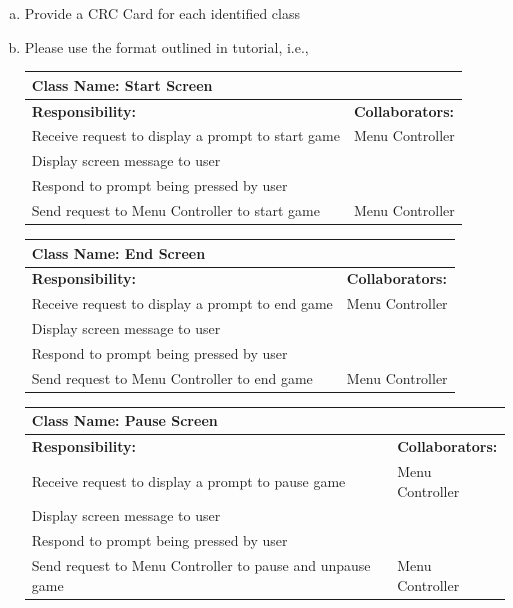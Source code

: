 \documentclass[12pt, titlepage]{article}
\begin{document}
\begin{enumerate}[a)]
	\item Provide a CRC Card for each identified class
	\item Please use the format outlined in tutorial, i.e., 

	\begin{table}[H]
		\centering
		\begin{tabular}{|p{10cm}|p{5cm}|}
		\hline 
		 \multicolumn{2}{|l|}{\textbf{Class Name: Start Screen}} \\
		\hline
		\textbf{Responsibility:} & \textbf{Collaborators:} \\
		\hline
		 Receive request to display a prompt to start game& Menu Controller \\
		\hline
		 Display screen message to user& \\
		\hline
		 Respond to prompt being pressed by user& \\
		\hline
		 Send request to Menu Controller to start game& Menu Controller \\
		\hline
		\end{tabular}
	\end{table}
	
	\begin{table}[H]
		\centering
		\begin{tabular}{|p{10cm}|p{5cm}|}
		\hline 
		 \multicolumn{2}{|l|}{\textbf{Class Name: End Screen}} \\
		\hline
		\textbf{Responsibility:} & \textbf{Collaborators:} \\
		\hline
		 Receive request to display a prompt to end game& Menu Controller \\
		\hline
		 Display screen message to user& \\
		\hline
		 Respond to prompt being pressed by user& \\
		\hline
		 Send request to Menu Controller to end game& Menu Controller \\
		\hline
		\end{tabular}
	\end{table}
	
	\begin{table}[H]
		\centering
		\begin{tabular}{|p{10cm}|p{5cm}|}
		\hline 
		 \multicolumn{2}{|l|}{\textbf{Class Name: Pause Screen}} \\
		\hline
		\textbf{Responsibility:} & \textbf{Collaborators:} \\
		\hline
		 Receive request to display a prompt to pause game& Menu Controller \\
		\hline
		 Display screen message to user& \\
		\hline
		 Respond to prompt being pressed by user& \\
		\hline
		 Send request to Menu Controller to pause and unpause game& Menu Controller \\
		\hline
		\end{tabular}
	\end{table}
	

\end{enumerate}
\end{document}
